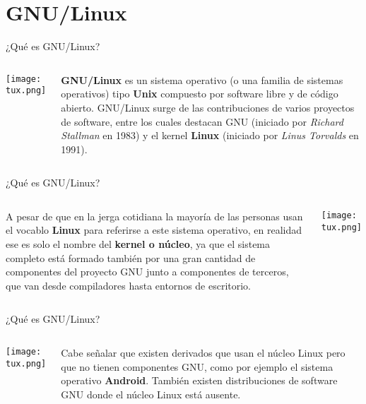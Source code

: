 
\section{GNU/Linux}

\begin{frame}[c]{¿Qué es GNU/Linux?}
    \begin{columns}
        \begin{center}
            \texttt{[image: tux.png]}
        \end{center}
        \pausa
        \textbf{GNU/Linux} es un sistema operativo (o una familia de sistemas
        operativos) tipo \textbf{Unix} compuesto por software libre y de código
        abierto. GNU/Linux surge de las contribuciones de varios proyectos
        de software, entre los cuales destacan GNU (iniciado por \emph{Richard
        Stallman} en 1983) y el kernel \textbf{Linux} (iniciado
        por \emph{Linus Torvalds} en 1991).
    \end{columns}
\end{frame}

\begin{frame}[c]{¿Qué es GNU/Linux?}
    \begin{columns}
        A pesar de que en la jerga cotidiana la mayoría de las personas usan
        el vocablo \textbf{Linux} para referirse a este sistema operativo, en
        realidad ese es solo el nombre del \textbf{kernel o núcleo}, ya que
        el sistema completo está formado también por una gran cantidad de
        componentes del proyecto GNU junto a componentes de terceros, que
        van desde compiladores hasta entornos de escritorio.
        \begin{center}
            \texttt{[image: tux.png]}
        \end{center}
    \end{columns}
\end{frame}

\begin{frame}[c]{¿Qué es GNU/Linux?}
    \begin{columns}
        \begin{center}
            \texttt{[image: tux.png]}
        \end{center}
        Cabe señalar que existen derivados que usan el núcleo Linux pero que
        no tienen componentes GNU, como por ejemplo el sistema operativo
        \textbf{Android}. También existen distribuciones de software GNU
        donde el núcleo Linux está ausente.
    \end{columns}
\end{frame}

